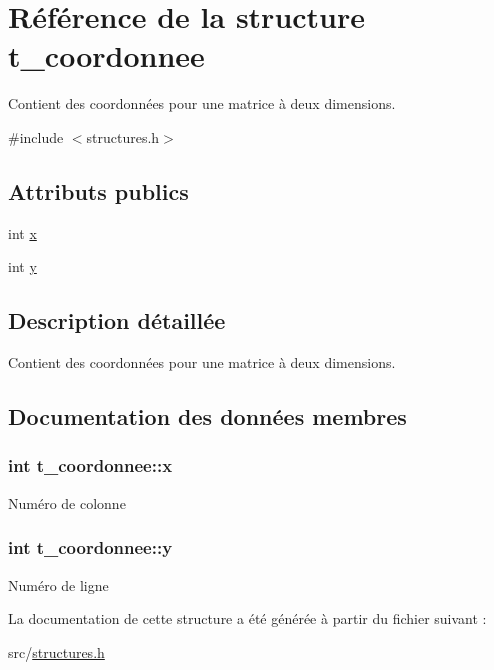 \hypertarget{structt__coordonnee}{}\section{Référence de la structure t\+\_\+coordonnee}
\label{structt__coordonnee}


Contient des coordonnées pour une matrice à deux dimensions.  




{\ttfamily \#include $<$structures.\+h$>$}

\subsection*{Attributs publics}
\begin{DoxyCompactItemize}
\item 
int \hyperlink{structt__coordonnee_adc43d2ee9bc8331939123bf7f019a5f6}{x}
\item 
int \hyperlink{structt__coordonnee_a59976d5ac64eac95bdbe12b4453f1af3}{y}
\end{DoxyCompactItemize}


\subsection{Description détaillée}
Contient des coordonnées pour une matrice à deux dimensions. 

\subsection{Documentation des données membres}
\subsubsection[{\texorpdfstring{x}{x}}]{\setlength{\rightskip}{0pt plus 5cm}int t\+\_\+coordonnee\+::x}\hypertarget{structt__coordonnee_adc43d2ee9bc8331939123bf7f019a5f6}{}\label{structt__coordonnee_adc43d2ee9bc8331939123bf7f019a5f6}
Numéro de colonne 
\subsubsection[{\texorpdfstring{y}{y}}]{\setlength{\rightskip}{0pt plus 5cm}int t\+\_\+coordonnee\+::y}\hypertarget{structt__coordonnee_a59976d5ac64eac95bdbe12b4453f1af3}{}\label{structt__coordonnee_a59976d5ac64eac95bdbe12b4453f1af3}
Numéro de ligne 

La documentation de cette structure a été générée à partir du fichier suivant \+:\begin{DoxyCompactItemize}
\item 
src/\hyperlink{structures_8h}{structures.\+h}\end{DoxyCompactItemize}
